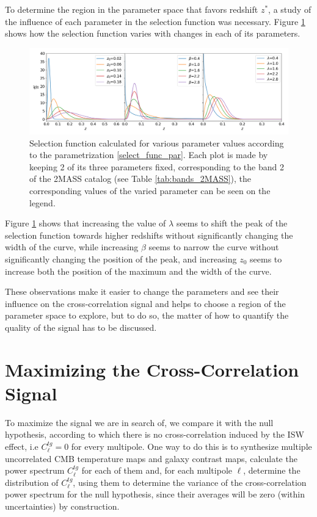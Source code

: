 \documentclass[openany,a4paper,12pt,oneside]{book}
\begin{document}
\begin{spacing}{1.5}
To determine the region in the parameter space that favors redshift $z^*$, a study of the influence of each parameter in the selection function was necessary. Figure \ref{fig:selection_tripleplot} shows how the selection function varies with changes in each of its parameters.

\begin{figure}[!htb]
	\centering
	\includegraphics[width=\linewidth]{Imagens/Selection_TriplePlot.png}
	\caption{Selection function calculated for various parameter values according to the parametrization \eqref{select_func_par}. Each plot is made by keeping 2 of its three parameters fixed, corresponding to the band 2 of the 2MASS catalog (see Table \ref{tab:bands_2MASS}), the corresponding values of the varied parameter can be seen on the legend.}
	\label{fig:selection_tripleplot}
\end{figure}

Figure \ref{fig:selection_tripleplot} shows that increasing the value of $\lambda$ seems to shift the peak of the selection function towards higher redshifts without significantly changing the width of the curve, while increasing $\beta$ seems to narrow the curve without significantly changing the position of the peak, and increasing $z_0$ seems to increase both the position of the maximum and the width of the curve. 

These observations make it easier to change the parameters and see their influence on the cross-correlation signal and helps to choose a region of the parameter space to explore, but to do so, the matter of how to quantify the quality of the signal has to be discussed.

\section{Maximizing the Cross-Correlation Signal}

To maximize the signal we are in search of, we compare it with the null hypothesis, according to which there is no cross-correlation induced by the ISW effect, i.e $C^{tg}_\ell=0$ for every multipole. One way to do this is to synthesize multiple uncorrelated CMB temperature maps and galaxy contrast maps, calculate the power spectrum $C^{tg}_\ell$ for each of them and, for each multipole $\ell$, determine the distribution of $C^{tg}_\ell$, using them to determine the variance of the cross-correlation power spectrum for the null hypothesis, since their averages will be zero (within uncertainties) by construction.


\end{spacing}
\end{document}

